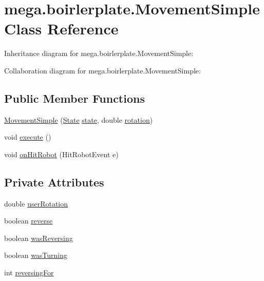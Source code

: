 \hypertarget{classmega_1_1boirlerplate_1_1_movement_simple}{}\section{mega.\+boirlerplate.\+Movement\+Simple Class Reference}
\label{classmega_1_1boirlerplate_1_1_movement_simple}


Inheritance diagram for mega.\+boirlerplate.\+Movement\+Simple\+:


Collaboration diagram for mega.\+boirlerplate.\+Movement\+Simple\+:
\subsection*{Public Member Functions}
\begin{DoxyCompactItemize}
\item 
\hyperlink{classmega_1_1boirlerplate_1_1_movement_simple_a91e53639e0649b8c4d60d433237fe190}{Movement\+Simple} (\hyperlink{classmega_1_1boirlerplate_1_1_state}{State} \hyperlink{classmega_1_1boirlerplate_1_1_component_a87b0d70f323b5fee60a200e07c9c20fd}{state}, double \hyperlink{classmega_1_1boirlerplate_1_1_movement_af8a9e7e7a7636121f3cfc9b01b8409fd}{rotation})
\item 
void \hyperlink{classmega_1_1boirlerplate_1_1_movement_simple_afe2d9d68fdf23e74b04fc5f99d34f5df}{execute} ()
\item 
void \hyperlink{classmega_1_1boirlerplate_1_1_movement_simple_a7e69aacc8d5089c87a536032db29d943}{on\+Hit\+Robot} (Hit\+Robot\+Event e)
\end{DoxyCompactItemize}
\subsection*{Private Attributes}
\begin{DoxyCompactItemize}
\item 
double \hyperlink{classmega_1_1boirlerplate_1_1_movement_simple_a3393e8a23d1cff8ed6a9c818455655c6}{user\+Rotation}
\item 
boolean \hyperlink{classmega_1_1boirlerplate_1_1_movement_simple_a83693e62de05f2b134880d881bd1cca6}{reverse}
\item 
boolean \hyperlink{classmega_1_1boirlerplate_1_1_movement_simple_a45108f9911514e2c5ebc70bb37b307c3}{was\+Reversing}
\item 
boolean \hyperlink{classmega_1_1boirlerplate_1_1_movement_simple_ac722e89b89bc797b819bfc31f486ae34}{was\+Turning}
\item 
int \hyperlink{classmega_1_1boirlerplate_1_1_movement_simple_ae4c33e8b8021545f204284ccc258888e}{reversing\+For}
\end{DoxyCompactItemize}

